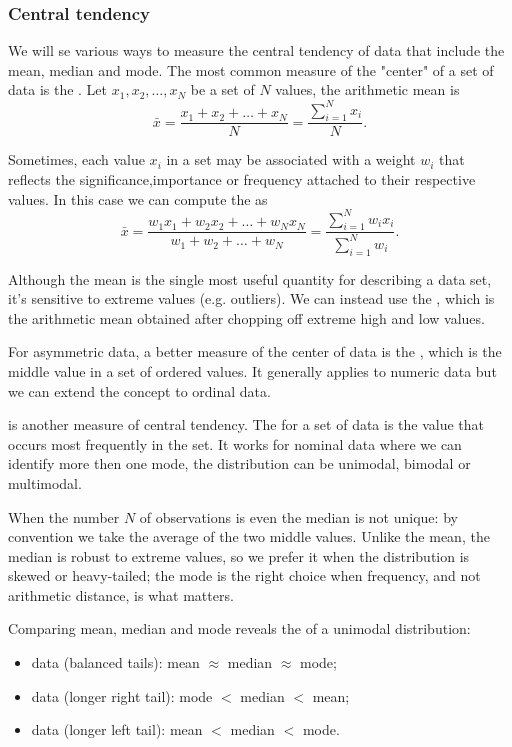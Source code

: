 \subsubsection{Central tendency}
We will se various ways to measure the central tendency of data that include the mean, median and mode.
The most common measure of the "center" of a set of data is the . Let $x_1,x_2,\dots,x_N$ be a set of $N$ values, the arithmetic mean is
\[
    \bar{x}=\frac{x_1+x_2+\dots+x_N}{N}=\frac{\sum_{i=1}^{N}x_i}{N}.
\]

Sometimes, each value $x_i$ in a set may be associated with a weight $w_i$ that reflects the significance,importance or frequency attached to their respective values. In this case we can compute the  as
\[
    \bar{x}=\frac{w_1x_1+w_2x_2+\dots+w_Nx_N}{w_1+w_2+\dots+w_N}=\frac{\sum_{i=1}^{N}w_ix_i}{\sum_{i=1}^{N}w_i}.
\]

Although the mean is the single most useful quantity for describing a data set, it's sensitive to extreme values (e.g. outliers). We can instead use the , which is the arithmetic mean obtained after chopping off extreme high and low values.

For asymmetric data, a better measure of the center of data is the , which is the middle value in a set of ordered values. It generally applies to numeric data but we can extend the concept to ordinal data.

 is another measure of central tendency. The  for a set of data is the value that occurs most frequently in the set. It works for nominal data where we can identify more then one mode, the distribution can be unimodal, bimodal or multimodal.

When the number $N$ of observations is even the median is not unique: by convention we take the average of the two middle values. Unlike the mean, the median is robust to extreme values, so we prefer it when the distribution is skewed or heavy-tailed; the mode is the right choice when frequency, and not arithmetic distance, is what matters.

Comparing mean, median and mode reveals the  of a unimodal distribution:
\begin{itemize}
    \item {} data (balanced tails): mean $\approx$ median $\approx$ mode;
    \item {} data (longer right tail): mode $<$ median $<$ mean;
    \item {} data (longer left tail): mean $<$ median $<$ mode.
\end{itemize}

